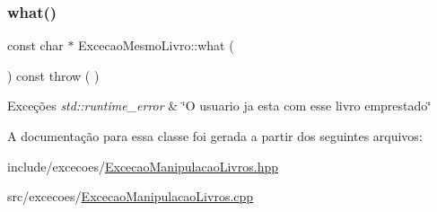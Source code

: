 \subsubsection{\texorpdfstring{what()}{what()}}
{\footnotesize\ttfamily const char $\ast$ Excecao\+Mesmo\+Livro\+::what (\begin{DoxyParamCaption}{ }\end{DoxyParamCaption}) const throw ( ) \hspace{0.3cm}{\ttfamily [virtual]}}


\begin{DoxyExceptions}{Exceções}
{\em std\+::runtime\+\_\+error} & \char`\"{}\+O usuario ja esta com esse livro emprestado\char`\"{} \\
\hline
\end{DoxyExceptions}


A documentação para essa classe foi gerada a partir dos seguintes arquivos\+:\begin{DoxyCompactItemize}
\item 
include/excecoes/\mbox{\hyperlink{_excecao_manipulacao_livros_8hpp}{Excecao\+Manipulacao\+Livros.\+hpp}}\item 
src/excecoes/\mbox{\hyperlink{_excecao_manipulacao_livros_8cpp}{Excecao\+Manipulacao\+Livros.\+cpp}}\end{DoxyCompactItemize}
